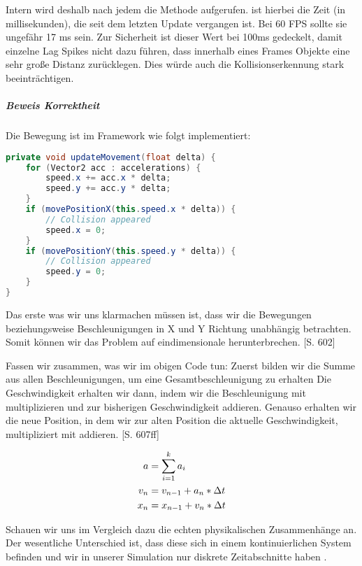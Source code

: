 Intern wird deshalb nach jedem  die Methode  aufgerufen.  ist hierbei die Zeit (in millisekunden), die seit dem letzten Update vergangen ist. Bei 60 FPS sollte sie ungefähr 17 ms sein. Zur Sicherheit ist dieser Wert bei 100ms gedeckelt, damit einzelne Lag Spikes nicht dazu führen, dass innerhalb eines Frames Objekte eine sehr große Distanz zurücklegen. Dies würde auch die Kollisionserkennung stark beeinträchtigen.

\subparagraph{Beweis Korrektheit}

Die Bewegung ist im Framework wie folgt implementiert:

\doinline
\begin{lstlisting}[caption=Framerate unabhängiges bewegen eines Entities, title=\hspace{0 pt}, language=java]
private void updateMovement(float delta) {
	for (Vector2 acc : accelerations) {
		speed.x += acc.x * delta;
		speed.y += acc.y * delta;
	}
	if (movePositionX(this.speed.x * delta)) {
		// Collision appeared
		speed.x = 0;
	}
	if (movePositionY(this.speed.y * delta)) {
		// Collision appeared
		speed.y = 0;
	}
}
\end{lstlisting}

Das erste was wir uns klarmachen müssen ist, dass wir die Bewegungen beziehungsweise Beschleunigungen in X und Y Richtung unabhängig betrachten. Somit können wir das Problem auf eindimensionale herunterbrechen. \cite{EMFGAIA}[S. 602]

Fassen wir zusammen, was wir im obigen Code tun:
Zuerst bilden wir die Summe aus allen Beschleunigungen, um eine Gesamtbeschleunigung zu erhalten
Die Geschwindigkeit erhalten wir dann, indem wir die Beschleunigung mit  multiplizieren und zur bisherigen Geschwindigkeit addieren.
Genauso erhalten wir die neue Position, in dem wir zur alten Position die aktuelle Geschwindigkeit, multipliziert mit  addieren. \cite{EMFGAIA}[S. 607ff]

\begin{align*}
    a &= \sum_{i=1}^{k}{a_i}  \\
  v_n &= v_{n-1} + a_n * \Delta t  \\
  x_n &= x_{n-1} + v_n * \Delta t
\end{align*}

Schauen wir uns im Vergleich dazu die echten physikalischen Zusammenhänge an. Der wesentliche Unterschied ist, dass diese sich in einem kontinuierlichen System befinden und wir in unserer Simulation nur diskrete Zeitabschnitte haben .

